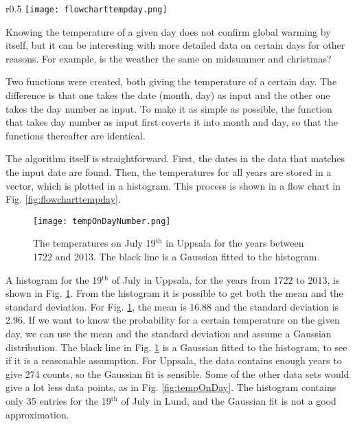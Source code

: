

\begin{wrapfigure}{r}{0.5\textwidth}
\centering
\texttt{[image: flowcharttempday.png]}
\caption{\label{fig:flowcharttempday} Flow chart for the function that gives the temperature of a given day.}
\end{wrapfigure}

Knowing the temperature of a given day does not confirm global warming by itself, but it can be interesting with more detailed data on certain days for other reasons. For example, is the weather the same on midsummer and christmas? 

Two functions were created, both giving the temperature of a certain day. The difference is that one takes the date (month, day) as input and the other one takes the day number as input. To make it as simple as possible, the function that takes day number as input first coverts it into month and day, so that the functions thereafter are identical. 

The algorithm itself is straightforward. First, the dates in the data that matches the input date are found. Then, the temperatures for all years are stored in a vector, which is plotted in a histogram. This process is shown in a flow chart in Fig. \ref{fig:flowcharttempday}. 

\begin{figure}[ht]
\begin{center}
\texttt{[image: tempOnDayNumber.png]}
\caption{\label{fig:tempOnDayNumber} The temperatures on July 19$^{\text{th}}$ in Uppsala for the years between 1722 and 2013. The black line is a Gaussian fitted to the histogram.}
\end{center}
\end{figure}

A histogram for the 19$^{\text{th}}$ of July in Uppsala, for the years from 1722 to 2013, is shown in Fig. \ref{fig:tempOnDayNumber}. From the histogram it is possible to get both the mean and the standard deviation. For Fig. \ref{fig:tempOnDayNumber}, the mean is 16.88 and the standard deviation is 2.96. If we want to know the probability for a certain temperature on the given day, we can use the mean and the standard deviation and assume a Gaussian distribution. The black line in Fig. \ref{fig:tempOnDayNumber} is a Gaussian fitted to the histogram, to see if it is a reasonable assumption. For Uppsala, the data contains enough years to give 274 counts, so the Gaussian fit is sensible. Some of the other data sets would give a lot less data points, as in Fig. \ref{fig:tempOnDay}. The histogram contains only 35 entries for the 19$^{\text{th}}$ of July in Lund, and the Gaussian fit is not a good approximation. 

